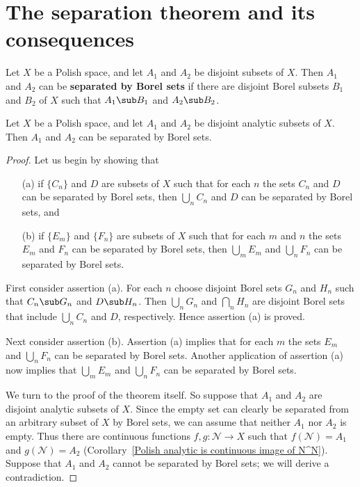 \section{The separation theorem and its consequences}
Let $X$ be a Polish space, and let $A_1$ and $A_2$ be disjoint subsets of $X$. Then $A_1$ and $A_2$ can be \textbf{separated by Borel sets} if there are disjoint Borel subsets $B_1$ and $B_2$ of $X$ such that $A_1\sub B_1$ and $A_2\sub B_2$.
\begin{theorem}\label{analytic separation theorem}
Let $X$ be a Polish space, and let $A_1$ and $A_2$ be disjoint analytic subsets of $X$. Then $A_1$ and $A_2$ can be separated by Borel sets.
\end{theorem}
\begin{proof}
Let us begin by showing that
\begin{itemize}
\item[(a)] if $\{C_n\}$ and $D$ are subsets of $X$ such that for each $n$ the sets $C_n$ and $D$ can be separated by Borel sets, then $\bigcup_nC_n$ and $D$ can be separated by Borel sets, and
\item[(b)] if $\{E_m\}$ and $\{F_n\}$ are subsets of $X$ such that for each $m$ and $n$ the sets $E_m$ and $F_n$ can be separated by Borel sets, then $\bigcup_mE_m$ and $\bigcup_nF_n$ can be separated by Borel sets.
\end{itemize}
First consider assertion (a). For each $n$ choose disjoint Borel sets $G_n$ and $H_n$ such that $C_n\sub G_n$ and $D\sub H_n$. Then $\bigcup_nG_n$ and $\bigcap_nH_n$ are disjoint Borel sets that include $\bigcup_nC_n$ and $D$, respectively. Hence assertion (a) is proved.\par
Next consider assertion (b). Assertion (a) implies that for each $m$ the sets $E_m$ and $\bigcup_nF_n$ can be separated by Borel sets. Another application of assertion (a) now implies that $\bigcup_mE_m$ and $\bigcup_nF_n$ can be separated by Borel sets.\par
We turn to the proof of the theorem itself. So suppose that $A_1$ and $A_2$ are disjoint analytic subsets of $X$. Since the empty set can clearly be separated from an arbitrary subset of $X$ by Borel sets, we can assume that neither $A_1$ nor $A_2$ is empty. Thus there are continuous functions $f,g:\mathscr{N}\to X$ such that $f(\mathscr{N})=A_1$ and $g(\mathscr{N})=A_2$ (Corollary~\ref{Polish analytic is continuous image of N^N}). Suppose that $A_1$ and $A_2$ cannot be separated by Borel sets; we will derive a contradiction.\par

\end{proof}
